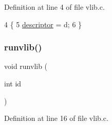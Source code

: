 Definition at line 4 of file vlib.\+c.


\begin{DoxyCode}
4                                   \{
5     \hyperlink{a00170_abe9fbaaf473cf2fa8d2a0ef1786fabd2_abe9fbaaf473cf2fa8d2a0ef1786fabd2}{descriptor} = d;
6 \}
\end{DoxyCode}
\mbox{\label{a00170_a6889af26c1cca94090023d5975955cbf_a6889af26c1cca94090023d5975955cbf}} 
\subsubsection{\texorpdfstring{runvlib()}{runvlib()}}
{\footnotesize\ttfamily void runvlib (\begin{DoxyParamCaption}\item[{int}]{id }\end{DoxyParamCaption})}



Definition at line 16 of file vlib.\+c.


